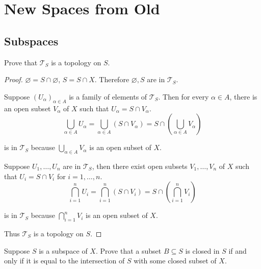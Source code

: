 \chapter{New Spaces from Old}

\section*{Subspaces}

\begin{exercise}{3.1}
	Prove that $\mathscr{T}_{S}$ is a topology on $S$.
\end{exercise}

\begin{proof}
	$\varnothing = S\cap\varnothing$, $S = S\cap X$. Therefore $\varnothing, S$ are in $\mathscr{T}_{S}$.

	Suppose ${(U_{\alpha})}_{\alpha\in A}$ is a family of elements of $\mathscr{T}_{S}$. Then for every $\alpha\in A$, there is an open subset $V_{\alpha}$ of $X$ such that $U_{\alpha} = S\cap V_{\alpha}$.
	\[
		\bigcup_{\alpha\in A}U_{\alpha} = \bigcup_{\alpha\in A}(S\cap V_{\alpha}) = S\cap \left(\bigcup_{\alpha\in A}V_{\alpha}\right)
	\]

	is in $\mathscr{T}_{S}$ because $\bigcup_{\alpha\in A}V_{\alpha}$ is an open subset of $X$.

	Suppose $U_{1}, \ldots, U_{n}$ are in $\mathscr{T}_{S}$, then there exist open subsets $V_{1}, \ldots, V_{n}$ of $X$ such that $U_{i} = S\cap V_{i}$ for $i = 1,\ldots, n$.
	\[
		\bigcap^{n}_{i=1}U_{i} = \bigcap^{n}_{i=1}(S\cap V_{i}) = S\cap \left(\bigcap^{n}_{i=1}V_{i}\right)
	\]

	is in $\mathscr{T}_{S}$ because $\bigcap^{n}_{i=1}V_{i}$ is an open subset of $X$.

	Thus $\mathscr{T}_{S}$ is a topology on $S$.
\end{proof}

\begin{exercise}{3.2}\label{exercise:3.2}
	Suppose $S$ is a subspace of $X$. Prove that a subset $B\subseteq S$ is closed in $S$ if and only if it is equal to the intersection of $S$ with some closed subset of $X$.
\end{exercise}

